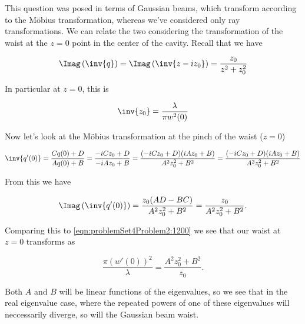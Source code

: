 {This question was posed in terms of Gaussian beams, which transform according to the M\"obius transformation, whereas we've considered only ray transformations.  We can relate the two considering the transformation of the waist at the $z = 0$ point in the center of the cavity.  Recall that we have

\begin{dmath}\label{eqn:problemSet4Problem2:1180}
\Imag\left( \inv{q} \right)
= \Imag \left( \inv{z - i z_0} \right)
= \frac{z_0}{z^2 + z_0^2}
\end{dmath}

In particular at $z = 0$, this is 

\begin{dmath}\label{eqn:problemSet4Problem2:1200}
\inv{z_0} = \frac{\lambda}{\pi w^2(0)}
\end{dmath}

Now let's look at the M\"obius transformation at the pinch of the waist ($z = 0$)

\begin{dmath}\label{eqn:problemSet4Problem2:1220}
\inv{q'(0)} 
= \frac{C q(0) + D}{A q(0) + B}
= \frac{-i C z_0 + D}{-i A z_0 + B}
= \frac{(-i C z_0 + D)( i A z_0 + B)}{
A^2 z_0^2 + B^2
}
= 
\frac{(-i C z_0 + D)( i A z_0 + B)}{
A^2 z_0^2 + B^2
}
\end{dmath}

From this we have

\begin{dmath}\label{eqn:problemSet4Problem2:1240}
\Imag\left( 
\inv{q'(0)} 
\right)
=
\frac{ z_0 (A D - B C)}
{
A^2 z_0^2 + B^2
}
=
\frac{ z_0 }
{
A^2 z_0^2 + B^2
}.
\end{dmath}

Comparing this to \ref{eqn:problemSet4Problem2:1200} we see that our waist at $z = 0$ transforms as

\begin{dmath}\label{eqn:problemSet4Problem2:1260}
\frac
{\pi (w'(0))^2}
{\lambda}
=
\frac
{
A^2 z_0^2 + B^2
}
{ z_0 }.
\end{dmath}

Both $A$ and $B$ will be linear functions of the eigenvalues, so we see that in the real eigenvalue case, where the repeated powers of one of these eigenvalues will neccessarily diverge, so will the Gaussian beam waist.

}
